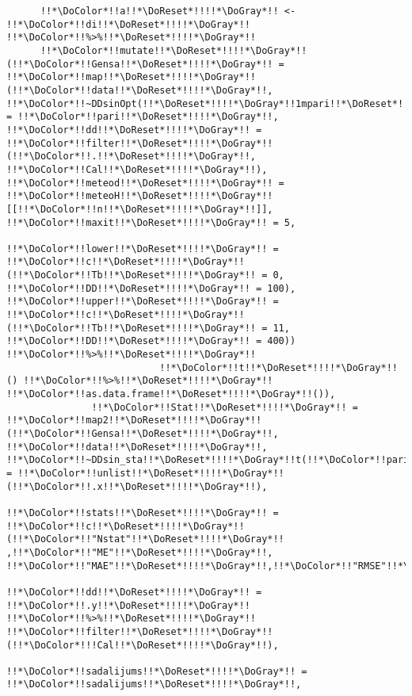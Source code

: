 \begin{verbatim}
      !!*\DoColor*!!a!!*\DoReset*!!!!*\DoGray*!! <- !!*\DoColor*!!di!!*\DoReset*!!!!*\DoGray*!! !!*\DoColor*!!%>%!!*\DoReset*!!!!*\DoGray*!!
      !!*\DoColor*!!mutate!!*\DoReset*!!!!*\DoGray*!!(!!*\DoColor*!!Gensa!!*\DoReset*!!!!*\DoGray*!! = !!*\DoColor*!!map!!*\DoReset*!!!!*\DoGray*!!(!!*\DoColor*!!data!!*\DoReset*!!!!*\DoGray*!!, !!*\DoColor*!!~DDsinOpt(!!*\DoReset*!!!!*\DoGray*!!1mpari!!*\DoReset*!!!!*\DoGray*!! = !!*\DoColor*!!pari!!*\DoReset*!!!!*\DoGray*!!, !!*\DoColor*!!dd!!*\DoReset*!!!!*\DoGray*!! = !!*\DoColor*!!filter!!*\DoReset*!!!!*\DoGray*!!(!!*\DoColor*!!.!!*\DoReset*!!!!*\DoGray*!!, !!*\DoColor*!!Cal!!*\DoReset*!!!!*\DoGray*!!), !!*\DoColor*!!meteod!!*\DoReset*!!!!*\DoGray*!! = !!*\DoColor*!!meteoH!!*\DoReset*!!!!*\DoGray*!![[!!*\DoColor*!!n!!*\DoReset*!!!!*\DoGray*!!]], !!*\DoColor*!!maxit!!*\DoReset*!!!!*\DoGray*!! = 5,
                                          !!*\DoColor*!!lower!!*\DoReset*!!!!*\DoGray*!! = !!*\DoColor*!!c!!*\DoReset*!!!!*\DoGray*!!(!!*\DoColor*!!Tb!!*\DoReset*!!!!*\DoGray*!! = 0, !!*\DoColor*!!DD!!*\DoReset*!!!!*\DoGray*!! = 100), !!*\DoColor*!!upper!!*\DoReset*!!!!*\DoGray*!! = !!*\DoColor*!!c!!*\DoReset*!!!!*\DoGray*!!(!!*\DoColor*!!Tb!!*\DoReset*!!!!*\DoGray*!! = 11, !!*\DoColor*!!DD!!*\DoReset*!!!!*\DoGray*!! = 400)) !!*\DoColor*!!%>%!!*\DoReset*!!!!*\DoGray*!!
                           !!*\DoColor*!!t!!*\DoReset*!!!!*\DoGray*!!() !!*\DoColor*!!%>%!!*\DoReset*!!!!*\DoGray*!! !!*\DoColor*!!as.data.frame!!*\DoReset*!!!!*\DoGray*!!()),
               !!*\DoColor*!!Stat!!*\DoReset*!!!!*\DoGray*!! = !!*\DoColor*!!map2!!*\DoReset*!!!!*\DoGray*!!(!!*\DoColor*!!Gensa!!*\DoReset*!!!!*\DoGray*!!, !!*\DoColor*!!data!!*\DoReset*!!!!*\DoGray*!!, !!*\DoColor*!!~DDsin_sta!!*\DoReset*!!!!*\DoGray*!!t(!!*\DoColor*!!pari!!*\DoReset*!!!!*\DoGray*!! = !!*\DoColor*!!unlist!!*\DoReset*!!!!*\DoGray*!!(!!*\DoColor*!!.x!!*\DoReset*!!!!*\DoGray*!!),
                                                   !!*\DoColor*!!stats!!*\DoReset*!!!!*\DoGray*!! = !!*\DoColor*!!c!!*\DoReset*!!!!*\DoGray*!!(!!*\DoColor*!!"Nstat"!!*\DoReset*!!!!*\DoGray*!! ,!!*\DoColor*!!"ME"!!*\DoReset*!!!!*\DoGray*!!, !!*\DoColor*!!"MAE"!!*\DoReset*!!!!*\DoGray*!!,!!*\DoColor*!!"RMSE"!!*\DoReset*!!!!*\DoGray*!!),
                                                   !!*\DoColor*!!dd!!*\DoReset*!!!!*\DoGray*!! = !!*\DoColor*!!.y!!*\DoReset*!!!!*\DoGray*!! !!*\DoColor*!!%>%!!*\DoReset*!!!!*\DoGray*!! !!*\DoColor*!!filter!!*\DoReset*!!!!*\DoGray*!!(!!*\DoColor*!!!Cal!!*\DoReset*!!!!*\DoGray*!!),
                                                   !!*\DoColor*!!sadalijums!!*\DoReset*!!!!*\DoGray*!! = !!*\DoColor*!!sadalijums!!*\DoReset*!!!!*\DoGray*!!,

\end{verbatim}
